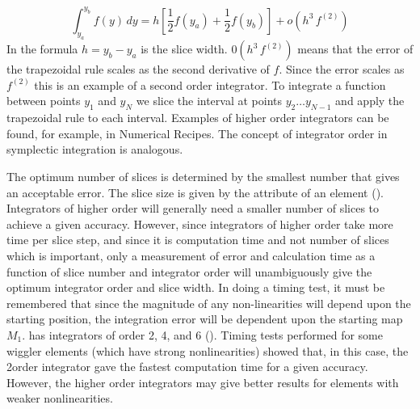 \begin{equation}
  \int_{y_a}^{y_b} f(y) \, dy = 
  h \left[ \frac{1}{2} f(y_a) + \frac{1}{2} f(y_b) \right] +
  o(h^3 \, f^{(2)})
\end{equation}
In the formula $h = y_b - y_a$ is the slice width. $0(h^3 \, f^{(2)})$
means that the error of the trapezoidal rule scales as the second
derivative of $f$. Since the error scales as $f^{(2)}$ this is an
example of a second order integrator. To integrate a function between
points $y_1$ and $y_N$ we slice the interval at points $y_2 \ldots y_{N-1}$
and apply the trapezoidal rule to each interval. Examples of higher
order integrators can be found, for example, in Numerical
Recipes\cite{b:nr}. The concept of integrator order in symplectic
integration is analogous. 

The optimum number of slices is determined by the smallest number that
gives an acceptable error. The slice size is given by the 
attribute of an element ().  Integrators of higher order
will generally need a smaller number of slices to achieve a given
accuracy. However, since integrators of higher order take more time
per slice step, and since it is computation time and not number of
slices which is important, only a measurement of error and calculation
time as a function of slice number and integrator order will
unambiguously give the optimum integrator order and slice width.  In
doing a timing test, it must be remembered that since the magnitude of
any non-linearities will depend upon the starting position, the
integration error will be dependent upon the starting map $M_1$. \bmad
has integrators of order 2, 4, and 6 (). Timing tests
performed for some wiggler elements (which have strong nonlinearities)
showed that, in this case, the 2\Nd order integrator gave the fastest
computation time for a given accuracy. However, the higher order
integrators may give better results for elements with weaker
nonlinearities.
